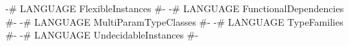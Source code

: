 \begin{code}
{-# LANGUAGE FlexibleInstances      #-}
{-# LANGUAGE FunctionalDependencies #-}
{-# LANGUAGE MultiParamTypeClasses  #-}
{-# LANGUAGE TypeFamilies           #-}
{-# LANGUAGE UndecidableInstances   #-}
\end{code}
